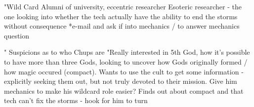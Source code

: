 \documentclass[char]{GL2020}
\begin{document}
\name{\cWildCard{}}








"Wild Card
Alumni of university, eccentric researcher 
Esoteric researcher - the one looking into whether the tech actually have the ability to end the storms without consequence
*e-mail and ask if into mechanics / to answer mechanics question

"	Suspicions as to who Chups are	"Really interested in 5th God, how it's possible to have more than three Gods, looking to uncover how Gods originally formed / how magic occured (compact). Wants to use the cult to get some information - explicitly seeking them out, but not truly devoted to their mission. Give him mechanics to make his wildcard role easier?
Finds out about compact and that tech can't fix the storms - hook for him to turn
\end{document}
